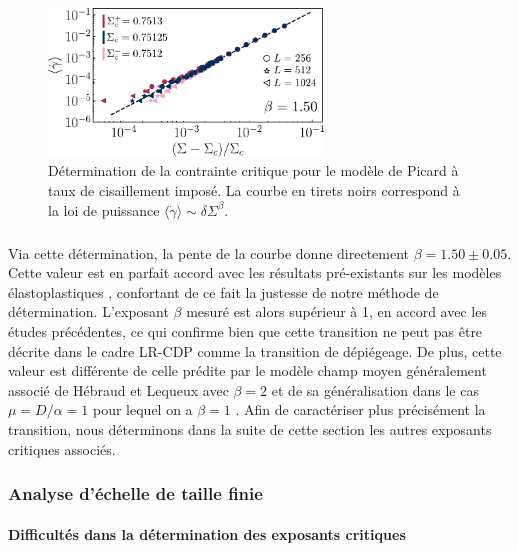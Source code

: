 \begin{figure}[h]
	\centering
	\includegraphics[width=0.65\textwidth]{Chapitre4/Figures/CasPhysique/CP_Classic.pdf}
	\caption{Détermination de la contrainte critique pour le modèle de Picard à taux de cisaillement imposé. La courbe en tirets noirs correspond à la loi de puissance $\langle\dot{\gamma}\rangle \sim \delta\Sigma^\beta$.}
	\label{fig:CP_Classic}
\end{figure}

\subparagraph{}Via cette détermination, la pente de la courbe donne directement $\beta=1.50 \pm 0.05$. Cette valeur est en parfait accord avec les résultats pré-existants sur les modèles élastoplastiques \cite{ferrero_criticality_2019, lin_scaling_2014}, confortant de ce fait la justesse de notre méthode de détermination. L'exposant $\beta$ mesuré est alors supérieur à 1, en accord avec les études précédentes, ce qui confirme bien que cette transition ne peut pas être décrite dans le cadre LR-CDP comme la transition de dépiégeage. De plus, cette valeur est différente de celle prédite par le modèle champ moyen généralement associé de Hébraud et Lequeux avec $\beta=2$ \cite{hebraud_mode-coupling_1998} et de sa généralisation dans le cas $\mu = D/\alpha = 1$ pour lequel on a $\beta = 1$ \cite{lin_mean-field_2016}. Afin de caractériser plus précisément la transition, nous déterminons dans la suite de cette section les autres exposants critiques associés.

\subsubsection{Analyse d'échelle de taille finie}

\paragraph{Difficultés dans la détermination des exposants critiques}

